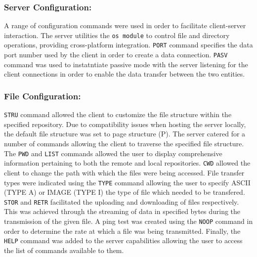 \documentclass[10pt,twocolumn]{witseiepaper}
\begin{document}
\subsubsection*{Server Configuration:}

A range of configuration commands were used in order to facilitate client-server interaction. The server utilities the \texttt{os module} to control file and directory operations, providing cross-platform integration. \texttt{PORT} command specifies the data port number used by the client in order to create a data connection. \texttt{PASV} command was used to instatntiate passive mode with the server listening for the client connections in order to enable the data transfer between the two entities.

\subsubsection*{File Configuration:}

\texttt{STRU} command allowed the client to customize the file structure within the specified repository. Due to compatibility issues when hosting the server locally, the default file structure was set to page structure (P). The server catered for a number of commands allowing the client to traverse the specified file structure. The \texttt{PWD} and \texttt{LIST} commands allowed the user to display comprehensive information pertaining to both the remote and local repositories. \texttt{CWD} allowed the client to change the path with which the files were being accessed. File transfer types were indicated using the \texttt{TYPE} command allowing the user to specify ASCII (TYPE A) or IMAGE (TYPE I) the type of file which needed to be transfered. \texttt{STOR} and \texttt{RETR} facilitated the uploading and downloading of files respectively. This was achieved through the streaming of data in specified bytes during the transmission of the given file. A ping test was created using the \texttt{NOOP} command in order to determine the rate at which a file was being transmitted. Finally, the \texttt{HELP} command was added to the server capabilities allowing the user to access the list of commands available to them.


\end{document}
